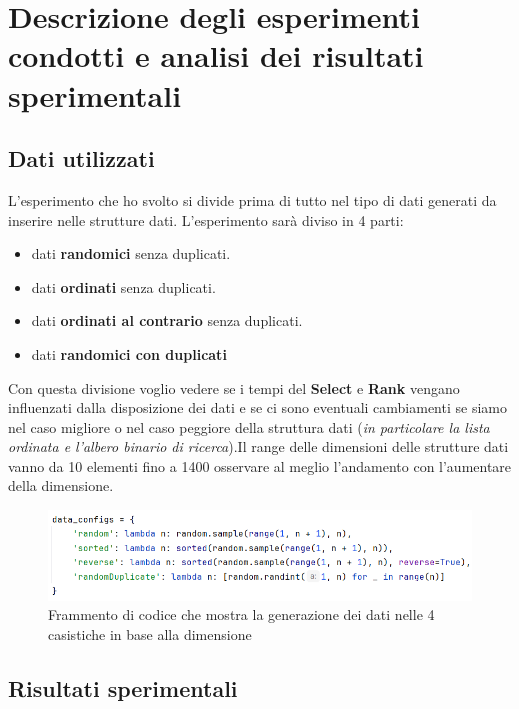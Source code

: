 \documentclass[10pt]{article}
\begin{document}
\section{Descrizione degli esperimenti condotti e analisi dei risultati sperimentali}
\subsection{Dati utilizzati}
L'esperimento che ho svolto si divide prima di tutto nel tipo di dati generati da inserire nelle strutture dati.
L'esperimento sarà diviso in 4 parti:
\begin{itemize}
    \item dati \textbf{randomici} senza duplicati.
    \item dati \textbf{ordinati} senza duplicati.
    \item dati \textbf{ordinati al contrario} senza duplicati.
    \item dati \textbf{randomici con duplicati}
\end{itemize}
Con questa divisione voglio vedere se i tempi del \textbf{Select} e \textbf{Rank} vengano influenzati dalla disposizione dei dati e se ci sono eventuali cambiamenti se siamo nel caso migliore o nel caso peggiore della struttura dati (\textit{in particolare la lista ordinata e l'albero binario di ricerca}).\newline Il range delle dimensioni delle strutture dati vanno da 10 elementi fino a 1400 osservare al meglio l'andamento con l'aumentare della dimensione.
\begin{figure}[H]
    \centering
    \includegraphics[width=1\linewidth]{resources/generatore dati.png}
    \caption{Frammento di codice che mostra la generazione dei dati nelle 4 casistiche in base alla dimensione}
    \label{Generator}
\end{figure}
\subsection{Risultati sperimentali}
\label{risultati sperimentali}
\end{document}
